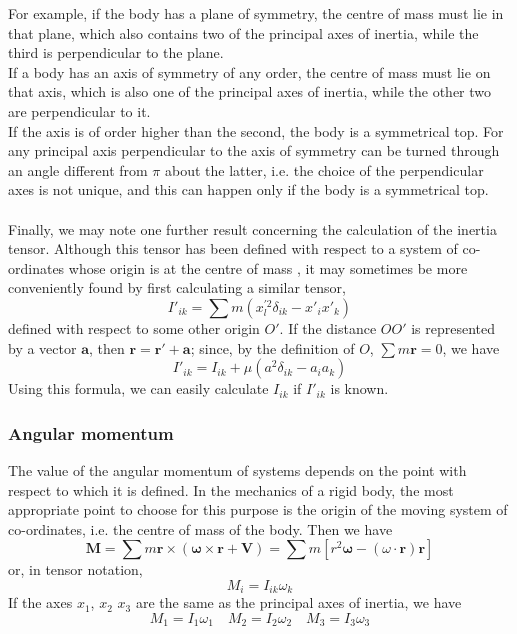 For example, if the body has a plane of symmetry, the centre of mass must lie in that plane, which also contains two of the principal axes of inertia, while the third is perpendicular to the plane. \\
If a body has an axis of symmetry of any order, the centre of mass must lie on that axis, which is also one of the principal axes of inertia, while the other two are perpendicular to it. \\
If the axis is of order higher than the second, the body is a symmetrical top. For any principal axis perpendicular to the axis of symmetry can be turned through an angle different from $\pi$ about the latter, i.e. the choice of the perpendicular axes is not unique, and this can happen only if the body is a symmetrical top.\\ \\
Finally, we may note one further result concerning the calculation of the inertia tensor. 
Although this tensor has been defined with respect to a system of co-ordinates whose origin is at the centre of mass , it may sometimes be more conveniently found by first calculating a similar tensor,
\[I'_{ik} = \sum m (x_l^{'2} \delta_{ik} - x'_i x'_k)\]
defined with respect to some other origin $O'$. If the distance $OO'$ is represented by a vector $\bm{a}$, then $\bm{r} = \bm{r'} + \bm{a}$; since, by the definition
of $O$, $\sum m\bm{r} = 0$, we have
\[I'_{ik} = I_{ik} + \mu (a^2\delta_{ik}-a_i a_k)\]
Using this formula, we can easily calculate $I_{ik}$ if $I'_{ik}$ is known.
\subsubsection{Angular momentum}
The value of the angular momentum of systems depends on the point with respect to which it is defined. In the mechanics of a rigid body, the most appropriate point to choose for this purpose is the origin of the moving system of co-ordinates, i.e. the centre of mass of the body. Then we have
\[\bm{M} = \sum m\bm{r} \times (\bm{\omega} \times \bm{r} + \bm{V}) = \sum m \left [ r^2\bm{\omega} - (\omega \cdot \bm{r})\bm{r} \right ]\]
or, in tensor notation,
\[M_i = I_{ik}\omega_k\]
If the axes $x_1$, $x_2$ $x_3$ are the same as the principal axes of inertia, we have
\[M_1 = I_1 \omega_1 \quad M_2 = I_2 \omega_2 \quad M_3 = I_3 \omega_3\]


